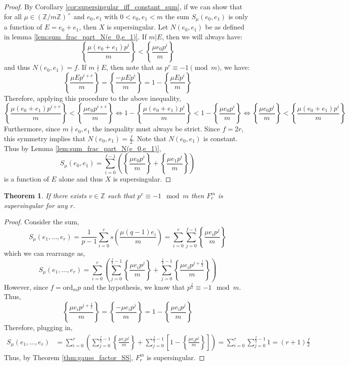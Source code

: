 \documentclass{article}
\newcommand{\Z}{\mathbb{Z}}
\newcommand{\ord}[0]{\mathrm{ord}}
\newtheorem{theorem}{Theorem}[section]
\theoremstyle{definition}
\theoremstyle{definition}
\theoremstyle{remark}
\begin{document}
\begin{proof} 
By Corollary \ref{cor:supersingular_iff_constant_sum}, if we can show that for all $\mu \in (\Z / m \Z)^\times$ and $e_0, e_1$ with $0 < e_0, e_1 < m$ the sum $S_\mu(e_0, e_1)$
is only a function of $E = e_0 + e_1$, then $X$ is supersingular. Let $N(e_0, e_1)$ be as defined in lemma \ref{lem:sum_frac_part_N(e_0,e_1)}.
If $m | E$, then we will always have: 
\begin{equation*} \label{eq:e_0e_1_inequality} 
\left\{\frac{\mu (e_0 + e_1)p^i}{m}\right\} < \left\{\frac{\mu e_0 p^i}{m}\right\} 
\end{equation*}
and thus $N(e_0, e_1) = f$. If $m \nmid E$, then note that as $p^{r} \equiv -1 \pmod{m}$, we have:
\[\left\{\frac{\mu Ep^{i+r}}{m}\right\} = \left\{\frac{-\mu Ep^{i}}{m}\right\} = 1 - \left\{\frac{\mu Ep^{i}}{m}\right\}\]
Therefore, applying this procedure to the above inequality,
\[ \left\{\frac{\mu (e_0 + e_1)p^{i+r}}{m}\right\} < \left\{\frac{\mu e_0 p^{i+r}}{m}\right\}  \iff 1 - \left\{\frac{\mu (e_0 + e_1)p^i}{m}\right\} < 1 - \left\{\frac{\mu e_0 p^i}{m}\right\} \iff  \left\{\frac{\mu e_0 p^i}{m}\right\} < \left\{\frac{\mu (e_0 + e_1)p^i}{m}\right\}   \]
Furthermore, since $m \nmid e_0, e_1$ the inequality must always be strict. Since $f = 2r$, this symmetry implies that $N(e_0, e_1) = \frac{f}{2}$. Note that $N(e_0, e_1)$ is constant. Thus by Lemma \ref{lem:sum_frac_part_N(e_0,e_1)}, 
\[ S_\mu(e_0, e_1) = \sum_{i = 0}^{f-1} \left( \left\{\frac{\mu e_0p^i}{m}\right\} + \left\{\frac{\mu e_1p^i}{m}\right\} \right) \]
is a function of $E$ alone and thus $X$ is supersingular.
\end{proof}



\begin{theorem}
If there exists $v \in \Z$ such that $p^v \equiv -1 \mod{m}$ then $F^m_r$ is supersingular for any $r$.
\end{theorem}

\begin{proof}
Consider the sum,
\[ S_\mu(e_1, \dots, e_r) = \frac{1}{p-1} \sum_{i = 0}^r s \left( \frac{\mu (q-1) e_i }{m} \right) = \sum_{i = 0}^r \sum_{j = 0}^{f-1} \left\{ \frac{\mu e_i p^j}{m} \right\} \]
which we can rearrange as,
\[ S_\mu(e_1, \dots, e_r) = \sum_{i = 0}^r \left( \sum_{j = 0}^{\frac{f}{2}-1} \left\{ \frac{\mu e_i p^j}{m} \right\} + \sum_{j = 0}^{\frac{f}{2}-1} \left\{ \frac{\mu e_i p^{j + \frac{f}{2}}}{m} \right\} \right) \]
However, since $f = \ord_m{p}$ and the hypothesis, we know that $p^{\frac{f}{2}} \equiv -1 \mod{m}$. Thus,
\[ \left\{ \frac{\mu e_i p^{j + \frac{f}{2}}}{m} \right\} = \left\{ \frac{-\mu e_i p^{j}}{m} \right\}  = 1 - \left\{ \frac{\mu e_i p^{j}}{m} \right\} \]
Therefore, plugging in, 
\begin{align*} 
S_\mu(e_1, \dots, e_r) &= \sum_{i = 0}^r \left( \sum_{j = 0}^{\frac{f}{2}-1} \left\{ \frac{\mu e_i p^j}{m} \right\} + \sum_{j = 0}^{\frac{f}{2}-1} \left[ 1 - \left\{ \frac{\mu e_i p^{j}}{m} \right\} \right] \right) = \sum_{i = 0}^r \sum_{j = 0}^{\frac{f}{2} - 1} 1 = (r + 1) \frac{f}{2} 
\end{align*}
Thus, by Theorem \ref{thm:gauss_factor_SS}, $F^m_r$ is supersingular.
\end{proof}
\end{document}
